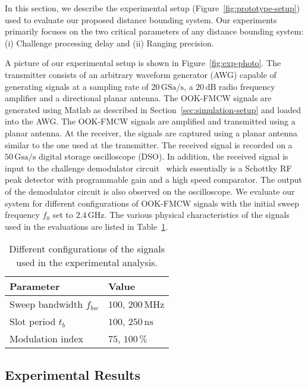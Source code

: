 \documentclass{sig-alternate-10pt}
\newcommand{\unit}[1]{\ensuremath{\, \mathrm{#1}}}
\begin{document}
In this section, we describe the experimental setup
(Figure~\ref{fig:prototype-setup}) used to evaluate our proposed distance
bounding system. Our experiments primarily focuses on the two critical
parameters of any distance bounding system: (i) Challenge processing delay and
(ii) Ranging precision.

A picture of our experimental setup is shown in Figure~\ref{fig:exp-photo}. The
transmitter consists of an arbitrary waveform generator (AWG) capable of
generating signals at a sampling rate of $20\unit{GSa/s}$, a $20\unit{dB}$ radio
frequency amplifier and a directional planar antenna. The OOK-FMCW signals are
generated using Matlab as described in Section~\ref{sec:simulation-setup} and
loaded into the AWG. The OOK-FMCW signals are amplified and transmitted using a
planar antenna. At the receiver, the signals are captured using a planar antenna
similar to the one used at the transmitter. The received signal is recorded on a
$50\unit{Gsa/s}$ digital storage oscilloscope (DSO). In addition, the received
signal is input to the challenge demodulator circuit~\cite{ltc5564datasheet}
which essentially is a Schottky RF peak detector with programmable gain and a
high speed comparator. The output of the demodulator circuit is also observed on
the oscilloscope. We evaluate our system for different configurations of
OOK-FMCW signals with the initial sweep frequency $f_0$ set to $2.4\unit{GHz}$.
The various physical characteristics of the signals used in the evaluations are
listed in Table~\ref{tab:exp-sig-config}.

\begin{table}
  \centering
  \begin{tabular}[h]{l|l}
  \hline
  \textbf{Parameter}&\textbf{Value}\\
  \hline
  Sweep bandwidth $f_{bw}$ & $100$, $200\unit{MHz}$\\
  Slot period $t_b$ & $100$, $250\unit{ns}$\\
  Modulation index & $75$, $100\unit{\%}$\\
  \hline
  \end{tabular}
  \caption{Different configurations of the signals used in the experimental analysis.}
  \label{tab:exp-sig-config}
\end{table}

\subsection{Experimental Results}
\label{sec:experimental-results}
\end{document}
